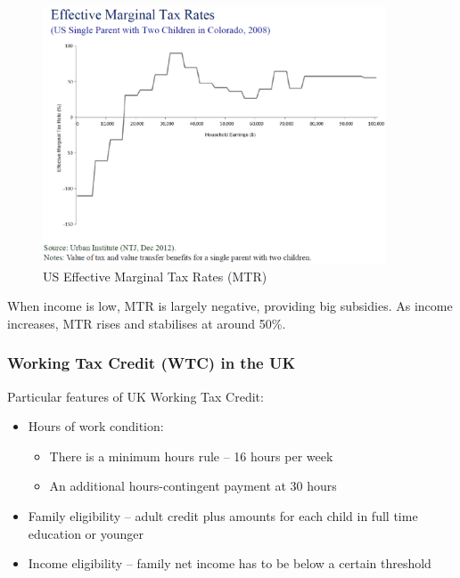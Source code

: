             \begin{figure}[H]
                \centering
                \includegraphics[width=4in]{images/ch13/13_US_MTR.png}
                \caption{US Effective Marginal Tax Rates (MTR)}
            \end{figure}
            When income is low, MTR is largely negative, providing big subsidies. As income increases, MTR rises and stabilises at around 50\%.

        \subsubsection{Working Tax Credit (WTC) in the UK}

            Particular features of UK Working Tax Credit:
            \begin{itemize}
                \item Hours of work condition:
                \begin{itemize}
                    \item There is a minimum hours rule -- 16 hours per week
                    \item An additional hours-contingent payment at 30 hours    
                \end{itemize}
                \item Family eligibility -- adult credit plus amounts for each child in full time education or younger
                \item Income eligibility -- family net income has to be below a certain threshold
            \end{itemize}

